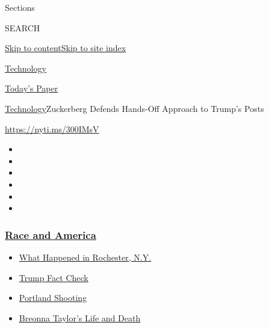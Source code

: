 Sections

SEARCH

\protect\hyperlink{site-content}{Skip to
content}\protect\hyperlink{site-index}{Skip to site index}

\href{https://www.nytimes3xbfgragh.onion/section/technology}{Technology}

\href{https://myaccount.nytimes3xbfgragh.onion/auth/login?response_type=cookie\&client_id=vi}{}

\href{https://www.nytimes3xbfgragh.onion/section/todayspaper}{Today's
Paper}

\href{/section/technology}{Technology}\textbar{}Zuckerberg Defends
Hands-Off Approach to Trump's Posts

\url{https://nyti.ms/300IMsV}

\begin{itemize}
\item
\item
\item
\item
\item
\item
\end{itemize}

\hypertarget{race-and-america}{%
\subsubsection{\texorpdfstring{\href{https://www.nytimes3xbfgragh.onion/news-event/george-floyd-protests-minneapolis-new-york-los-angeles?name=styln-george-floyd\&region=TOP_BANNER\&block=storyline_menu_recirc\&action=click\&pgtype=Article\&impression_id=84811a80-f28f-11ea-8789-45ae9f4c38e2\&variant=undefined}{Race
and America}}{Race and America}}\label{race-and-america}}

\begin{itemize}
\tightlist
\item
  \href{https://www.nytimes3xbfgragh.onion/2020/09/04/nyregion/rochester-police-daniel-prude.html?name=styln-george-floyd\&region=TOP_BANNER\&block=storyline_menu_recirc\&action=click\&pgtype=Article\&impression_id=84811a81-f28f-11ea-8789-45ae9f4c38e2\&variant=undefined}{What
  Happened in Rochester, N.Y.}
\item
  \href{https://www.nytimes3xbfgragh.onion/2020/09/01/us/politics/trump-fact-check-protests.html?name=styln-george-floyd\&region=TOP_BANNER\&block=storyline_menu_recirc\&action=click\&pgtype=Article\&impression_id=84811a82-f28f-11ea-8789-45ae9f4c38e2\&variant=undefined}{Trump
  Fact Check}
\item
  \href{https://www.nytimes3xbfgragh.onion/2020/08/30/us/portland-shooting-explained.html?name=styln-george-floyd\&region=TOP_BANNER\&block=storyline_menu_recirc\&action=click\&pgtype=Article\&impression_id=84814190-f28f-11ea-8789-45ae9f4c38e2\&variant=undefined}{Portland
  Shooting}
\item
  \href{https://www.nytimes3xbfgragh.onion/2020/08/30/us/breonna-taylor-police-killing.html?name=styln-george-floyd\&region=TOP_BANNER\&block=storyline_menu_recirc\&action=click\&pgtype=Article\&impression_id=84814191-f28f-11ea-8789-45ae9f4c38e2\&variant=undefined}{Breonna
  Taylor's Life and Death}
\end{itemize}

